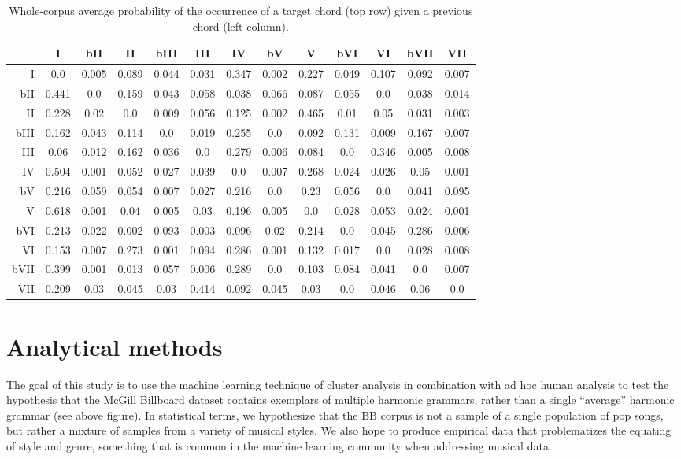 \begin{table}[htbp]
\begin{minipage}{\linewidth}
\setlength{\tymax}{0.5\linewidth}
\centering
\small
\caption{Whole-corpus average probability of the occurrence of a target chord (top row) given a previous chord (left column).}
\label{whole-corpusaverageprobabilityoftheoccurrenceofatargetchordtoprowgivenapreviouschordleftcolumn.}
\begin{tabulary}{\textwidth}{@{}RCCCCCCCCCCCC@{}} \toprule
&I&bII&II&bIII&III&IV&bV&V&bVI&VI&bVII&VII\\
\midrule
I&0.0&0.005&0.089&0.044&0.031&0.347&0.002&0.227&0.049&0.107&0.092&0.007\\
bII&0.441&0.0&0.159&0.043&0.058&0.038&0.066&0.087&0.055&0.0&0.038&0.014\\
II&0.228&0.02&0.0&0.009&0.056&0.125&0.002&0.465&0.01&0.05&0.031&0.003\\
bIII&0.162&0.043&0.114&0.0&0.019&0.255&0.0&0.092&0.131&0.009&0.167&0.007\\
III&0.06&0.012&0.162&0.036&0.0&0.279&0.006&0.084&0.0&0.346&0.005&0.008\\
IV&0.504&0.001&0.052&0.027&0.039&0.0&0.007&0.268&0.024&0.026&0.05&0.001\\
bV&0.216&0.059&0.054&0.007&0.027&0.216&0.0&0.23&0.056&0.0&0.041&0.095\\
V&0.618&0.001&0.04&0.005&0.03&0.196&0.005&0.0&0.028&0.053&0.024&0.001\\
bVI&0.213&0.022&0.002&0.093&0.003&0.096&0.02&0.214&0.0&0.045&0.286&0.006\\
VI&0.153&0.007&0.273&0.001&0.094&0.286&0.001&0.132&0.017&0.0&0.028&0.008\\
bVII&0.399&0.001&0.013&0.057&0.006&0.289&0.0&0.103&0.084&0.041&0.0&0.007\\
VII&0.209&0.03&0.045&0.03&0.414&0.092&0.045&0.03&0.0&0.046&0.06&0.0\\

\bottomrule

\end{tabulary}
\end{minipage}
\end{table}

\chapter{Analytical methods}
\label{analyticalmethods}

The goal of this study is to use the machine learning technique of cluster analysis in combination with ad hoc human analysis to test the hypothesis that the McGill Billboard dataset contains exemplars of multiple harmonic grammars, rather than a single ``average'' harmonic grammar (see above figure). In statistical terms, we hypothesize that the BB corpus is not a sample of a single population of pop songs, but rather a mixture of samples from a variety of musical styles. We also hope to produce empirical data that problematizes the equating of style and genre, something that is common in the machine learning community when addressing musical data.

